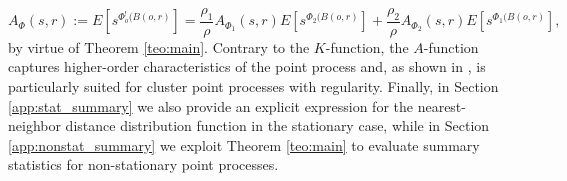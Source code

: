 \documentclass[11pt,a4paper,oneside]{article}
\newcommand{\E}{E}
\newcommand{\X}{\mathbb{X}}
\theoremstyle{definition}
\theoremstyle{remark}
\begin{document}
\begin{equation} \label{eq:A}
    A_{\Phi}(s, r) := \E\left[s^{\Phi^!_o(B(o, r)}\right] = \frac{\rho_1}{\rho} A_{\Phi_1}(s, r) \E\left[s^{\Phi_2(B(o, r)}\right] + \frac{\rho_2}{\rho} A_{\Phi_2}(s, r) \E\left[s^{\Phi_1(B(o, r)}\right], 
\end{equation}
by virtue of Theorem \ref{teo:main}. Contrary to the $K$-function, the $A$-function captures higher-order characteristics of the point process and, as shown in \cite{chiu2008reduced}, is particularly suited for cluster point processes with regularity. Finally, in Section \ref{app:stat_summary} we also provide an explicit expression for the nearest-neighbor distance distribution function in the stationary case, while in Section \ref{app:nonstat_summary} we exploit Theorem \ref{teo:main} to evaluate summary statistics for non-stationary point processes. 




\end{document}
